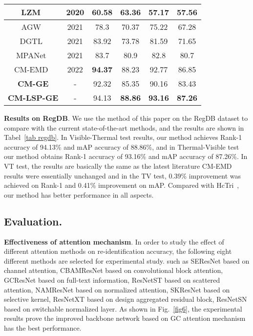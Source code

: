 \documentclass[journal]{IEEEtran}
\begin{document}
\begin{table}[]
\begin{tabular}{c|c|cc|cc}
		LZM~\cite{basaran2020efficient}                      & 2020                  & 60.58                       & 63.36          & 57.17                       & 57.56          \\ \hline
		AGW~\cite{xia2021visible}                       & 2021                  & 78.3                        & 70.37          & 75.22                       & 67.28          \\
		DGTL~\cite{liu2021strong}                     & 2021                  & 83.92                       & 73.78          & 81.59                       & 71.65          \\
		MPANet~\cite{wu2021discover}                   & 2021                  & 83.7                        & 80.9           & 82.8                        & 80.7           \\ \hline
		CM-EMD~\cite{ling2022cross}                   & 2022                  & \textbf{94.37}              & 88.23          & 92.77                       & 86.85          \\ \hline
		\textbf{CM-GE}           & -                     & 92.32                       & 85.35          & 90.16                       & 83.43          \\
		\textbf{CM-LSP-GE}       & -                     & 94.13                       & \textbf{88.86} & \textbf{93.16}              & \textbf{87.26} \\ \hline
	\end{tabular}
\end{table}

\textbf{Results on RegDB}.
We use the method of this paper on the RegDB dataset to compare with the current state-of-the-art methods, and the results are shown in Tabel~\ref{tab regdb}. In Visible-Thermal test results, our method achieves Rank-1 accuracy of 94.13\% and mAP accuracy of 88.86\%, and in Thermal-Visible test our method obtains Rank-1 accuracy of 93.16\% and mAP accuracy of 87.26\%. In VT test, the results are basically the same as the latest literature CM-EMD~\cite{ling2022cross} results were essentially unchanged and in the TV test, 0.39\% improvement was achieved on Rank-1 and 0.41\% improvement on mAP. Compared with HcTri~\cite{liu2020parameter}, our method has better performance in all aspects.


\subsection{Evaluation.}
\textbf{Effectiveness of attention mechanism}.
In order to study the effect of different attention methods on re-identification accuracy, the following eight different methods are selected for experimental study. such as SEResNet based on channel attention, CBAMResNet based on convolutional block attention, GCResNet based on full-text information, ResNetST based on scattered attention, NAMResNet based on normalized attention, SKResNet based on selective kernel, ResNetXT based on design aggregated residual block, ResNetSN based on switchable normalized layer. As shown in Fig.~\ref{fig6}, the experimental results prove the improved backbone network based on GC attention mechanism has the best performance.
\end{document}
